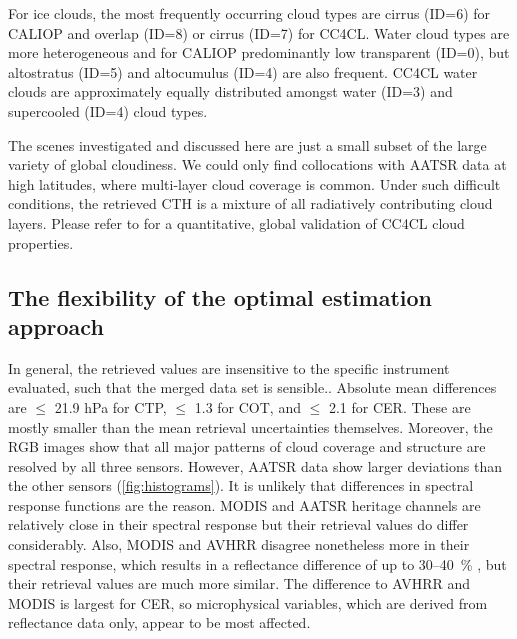 For ice clouds, the most frequently occurring cloud types are cirrus (ID=6) for CALIOP and overlap (ID=8) or cirrus (ID=7) for CC4CL. Water cloud types are more heterogeneous and for CALIOP predominantly low transparent (ID=0), but altostratus (ID=5) and altocumulus (ID=4) are also frequent. CC4CL water clouds are approximately equally distributed amongst water (ID=3) and supercooled (ID=4) cloud types. %

The scenes investigated and discussed here are just a small subset of the large variety of global cloudiness. We could only find collocations with AATSR data at high latitudes, where multi-layer cloud coverage is common. Under such difficult conditions, the retrieved CTH is a mixture of all radiatively contributing cloud layers. Please refer to \citet{Stengel17} for a quantitative, global validation of CC4CL cloud properties.

\conclusions[Discussion]\label{discussion}
\subsection{The flexibility of the optimal estimation approach}

In general, the retrieved values are insensitive to the specific instrument evaluated, such that the merged data set is sensible.. Absolute mean differences are $\leq$ 21.9 hPa for CTP, $\leq$ 1.3 for COT, and $\leq$ 2.1 for CER. These are mostly smaller than the mean retrieval uncertainties themselves. Moreover, the RGB images show that all major patterns of cloud coverage and structure are resolved by all three sensors. However, AATSR data show larger deviations than the other sensors (\cref{fig:histograms}). It is unlikely that differences in spectral response functions are the reason. MODIS and AATSR heritage channels are relatively close in their spectral response but their retrieval values do differ considerably. Also, MODIS and AVHRR disagree nonetheless more in their spectral response, which results in a reflectance difference of up to 30--40~\% \citep{Trishchenko02}, but their retrieval values are much more similar. The difference to AVHRR and MODIS is largest for CER, so microphysical variables, which are derived from reflectance data only, appear to be most affected. 

